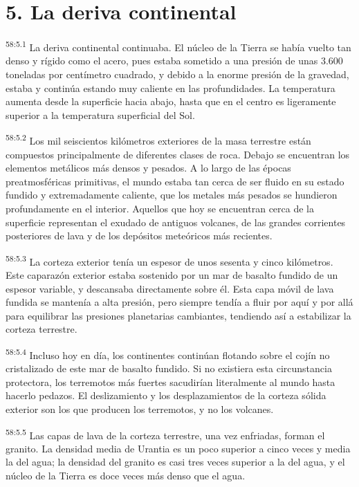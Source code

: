\section*{5. La deriva continental}
\par
\textsuperscript{58:5.1} La deriva continental continuaba. El núcleo de la Tierra se había vuelto tan denso y rígido como el acero, pues estaba sometido a una presión de unas 3.600 toneladas por centímetro cuadrado, y debido a la enorme presión de la gravedad, estaba y continúa estando muy caliente en las profundidades. La temperatura aumenta desde la superficie hacia abajo, hasta que en el centro es ligeramente superior a la temperatura superficial del Sol.

\par
\textsuperscript{58:5.2} Los mil seiscientos kilómetros exteriores de la masa terrestre están compuestos principalmente de diferentes clases de roca. Debajo se encuentran los elementos metálicos más densos y pesados. A lo largo de las épocas preatmosféricas primitivas, el mundo estaba tan cerca de ser fluido en su estado fundido y extremadamente caliente, que los metales más pesados se hundieron profundamente en el interior. Aquellos que hoy se encuentran cerca de la superficie representan el exudado de antiguos volcanes, de las grandes corrientes posteriores de lava y de los depósitos meteóricos más recientes.

\par
\textsuperscript{58:5.3} La corteza exterior tenía un espesor de unos sesenta y cinco kilómetros. Este caparazón exterior estaba sostenido por un mar de basalto fundido de un espesor variable, y descansaba directamente sobre él. Esta capa móvil de lava fundida se mantenía a alta presión, pero siempre tendía a fluir por aquí y por allá para equilibrar las presiones planetarias cambiantes, tendiendo así a estabilizar la corteza terrestre.

\par
\textsuperscript{58:5.4} Incluso hoy en día, los continentes continúan flotando sobre el cojín no cristalizado de este mar de basalto fundido. Si no existiera esta circunstancia protectora, los terremotos más fuertes sacudirían literalmente al mundo hasta hacerlo pedazos. El deslizamiento y los desplazamientos de la corteza sólida exterior son los que producen los terremotos, y no los volcanes.

\par
\textsuperscript{58:5.5} Las capas de lava de la corteza terrestre, una vez enfriadas, forman el granito. La densidad media de Urantia es un poco superior a cinco veces y media la del agua; la densidad del granito es casi tres veces superior a la del agua, y el núcleo de la Tierra es doce veces más denso que el agua.

